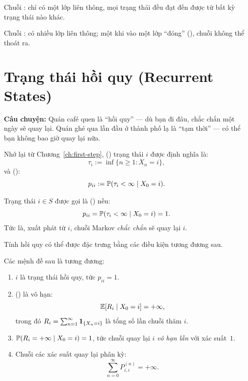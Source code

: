 \begin{tomtat}
Chuỗi : chỉ có một lớp liên thông, mọi trạng thái đều đạt đến được từ bất kỳ
trạng thái nào khác.

Chuỗi : có nhiều lớp liên thông; một khi vào một lớp ``đóng'' (),
chuỗi không thể thoát ra.
\end{tomtat}

\section{Trạng thái hồi quy (Recurrent States)}
\label{sec:recurrent-states}

\textbf{Câu chuyện:} Quán café quen là ``hồi quy'' --- dù bạn đi đâu, chắc chắn một ngày sẽ quay lại.
Quán ghé qua lần đầu ở thành phố lạ là ``tạm thời'' --- có thể bạn không bao giờ quay lại nữa.

Nhớ lại từ Chương~\ref{ch:first-step},  () trạng thái $i$
được định nghĩa là:
\[
  \tau_i := \inf\{n \geq 1 : X_n = i\},
\]
và  ():
\[
  p_{ii} := \mathbb{P}(\tau_i < \infty \mid X_0 = i).
\]

\begin{dinhnghia}
\label{def:recurrent}
Trạng thái $i \in S$ được gọi là  () nếu:
\begin{equation}\label{eq:recurrent-def}
  p_{ii} = \mathbb{P}(\tau_i < \infty \mid X_0 = i) = 1.
\end{equation}
Tức là, xuất phát từ $i$, chuỗi Markov \emph{chắc chắn} sẽ quay lại $i$.
\end{dinhnghia}

Tính hồi quy có thể được đặc trưng bằng các điều kiện tương đương sau.

\begin{dinhly}
\label{thm:recurrent-equiv}
Các mệnh đề sau là tương đương:
\begin{enumerate}[label=(\roman*)]
  \item $i$ là trạng thái hồi quy, tức $p_{ii} = 1$.
  \item {} () là vô hạn:
        \begin{equation}\label{eq:recurrent-Ri}
          \mathbb{E}[R_i \mid X_0 = i] = +\infty,
        \end{equation}
        trong đó $R_i = \sum_{n=1}^{\infty} \mathbf{1}_{\{X_n = i\}}$ là tổng số lần chuỗi thăm $i$.
  \item $\mathbb{P}(R_i = +\infty \mid X_0 = i) = 1$, tức chuỗi quay lại $i$ \emph{vô hạn lần} với xác suất~$1$.
  \item Chuỗi các xác suất quay lại phân kỳ:
        \begin{equation}\label{eq:recurrent-series}
          \sum_{n=0}^{\infty} P_{i,i}^{(n)} = +\infty.
        \end{equation}
\end{enumerate}
\end{dinhly}

